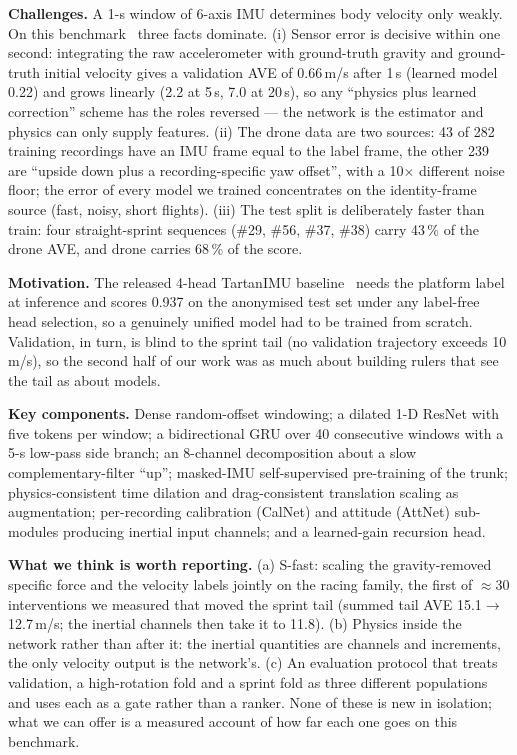\documentclass[letterpaper,10pt,conference]{ieeeconf}
\begin{document}
\textbf{Challenges.} A 1-s window of 6-axis IMU determines body velocity only weakly. On this
benchmark~\cite{imuchallenge} three facts dominate. (i) Sensor error is decisive within one second: integrating the raw
accelerometer with ground-truth gravity and ground-truth initial velocity gives a validation AVE of
0.66\,m/s after 1\,s (learned model 0.22) and grows linearly (2.2 at 5\,s, 7.0 at 20\,s), so any
``physics plus learned correction'' scheme has the roles reversed --- the network is the estimator
and physics can only supply features. (ii) The drone data are two sources: 43 of 282 training
recordings have an IMU frame equal to the label frame, the other 239 are ``upside down plus a
recording-specific yaw offset'', with a 10$\times$ different noise floor; the error of every model
we trained concentrates on the identity-frame source (fast, noisy, short flights). (iii) The test
split is deliberately faster than train: four straight-sprint sequences (\#29, \#56, \#37, \#38)
carry 43\,\% of the drone AVE, and drone carries 68\,\% of the score.

\textbf{Motivation.} The released 4-head TartanIMU baseline~\cite{tartanimu} needs the platform label at inference and scores
0.937 on the anonymised test set under any label-free head selection, so a genuinely unified model
had to be trained from scratch. Validation, in turn, is blind to the sprint tail (no validation
trajectory exceeds 10\,m/s), so the second half of our work was as much about building rulers that
see the tail as about models.

\textbf{Key components.} Dense random-offset windowing; a dilated 1-D ResNet with five tokens per
window; a bidirectional GRU over 40 consecutive windows with a 5-s low-pass side branch; an
8-channel decomposition about a slow complementary-filter ``up''; masked-IMU self-supervised
pre-training of the trunk; physics-consistent time dilation and drag-consistent translation scaling
as augmentation; per-recording calibration (CalNet) and attitude (AttNet) sub-modules producing
inertial input channels; and a learned-gain recursion head.

\textbf{What we think is worth reporting.} (a) S-fast: scaling the gravity-removed specific force
and the velocity labels jointly on the racing family, the first of $\approx$30 interventions we
measured that moved the sprint tail (summed tail AVE 15.1$\to$12.7\,m/s; the inertial channels then
take it to 11.8). (b) Physics inside the network rather than after it: the inertial quantities are
channels and increments, the only velocity output is the network's. (c) An evaluation protocol that
treats validation, a high-rotation fold and a sprint fold as three different populations and uses
each as a gate rather than a ranker. None of these is new in isolation; what we can offer is a
measured account of how far each one goes on this benchmark.
\end{document}
